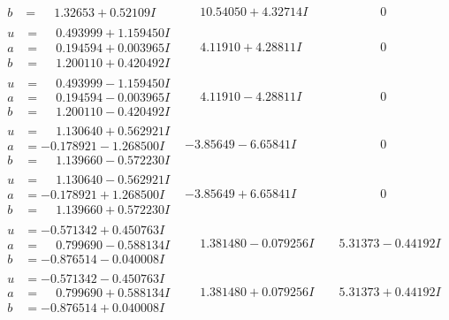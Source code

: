 \documentclass[1p]{elsarticle_modified}
\theoremstyle{definition}
\begin{document}
$$\begin{array}{c|c|c}
\begin{aligned}
b &= \phantom{-}1.32653 + 0.52109 I\end{aligned}
 & \phantom{-}10.54050 + 4.32714 I & \phantom{-0.000000 } 0 \\ \hline\begin{aligned}
u &= \phantom{-}0.493999 + 1.159450 I \\
a &= \phantom{-}0.194594 + 0.003965 I \\
b &= \phantom{-}1.200110 + 0.420492 I\end{aligned}
 & \phantom{-}4.11910 + 4.28811 I & \phantom{-0.000000 } 0 \\ \hline\begin{aligned}
u &= \phantom{-}0.493999 - 1.159450 I \\
a &= \phantom{-}0.194594 - 0.003965 I \\
b &= \phantom{-}1.200110 - 0.420492 I\end{aligned}
 & \phantom{-}4.11910 - 4.28811 I & \phantom{-0.000000 } 0 \\ \hline\begin{aligned}
u &= \phantom{-}1.130640 + 0.562921 I \\
a &= -0.178921 - 1.268500 I \\
b &= \phantom{-}1.139660 - 0.572230 I\end{aligned}
 & -3.85649 - 6.65841 I & \phantom{-0.000000 } 0 \\ \hline\begin{aligned}
u &= \phantom{-}1.130640 - 0.562921 I \\
a &= -0.178921 + 1.268500 I \\
b &= \phantom{-}1.139660 + 0.572230 I\end{aligned}
 & -3.85649 + 6.65841 I & \phantom{-0.000000 } 0 \\ \hline\begin{aligned}
u &= -0.571342 + 0.450763 I \\
a &= \phantom{-}0.799690 - 0.588134 I \\
b &= -0.876514 - 0.040008 I\end{aligned}
 & \phantom{-}1.381480 - 0.079256 I & \phantom{-}5.31373 - 0.44192 I \\ \hline\begin{aligned}
u &= -0.571342 - 0.450763 I \\
a &= \phantom{-}0.799690 + 0.588134 I \\
b &= -0.876514 + 0.040008 I\end{aligned}
 & \phantom{-}1.381480 + 0.079256 I & \phantom{-}5.31373 + 0.44192 I \\ \hline\begin{aligned}

\end{aligned}
\end{array}$$
\end{document}
